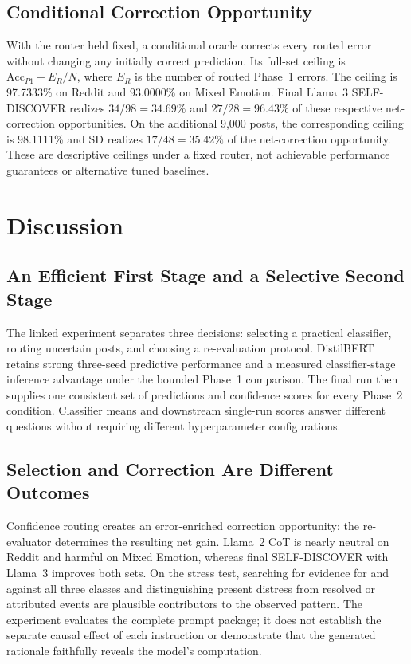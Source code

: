 \documentclass{ieeeaccess}
\begin{document}
\subsection{Conditional Correction Opportunity}
With the router held fixed, a conditional oracle corrects every routed error without changing any initially correct prediction. Its full-set ceiling is $\mathrm{Acc}_{P1}+E_R/N$, where $E_R$ is the number of routed Phase~1 errors. The ceiling is 97.7333\% on Reddit and 93.0000\% on Mixed Emotion. Final Llama~3 SELF-DISCOVER realizes $34/98=34.69\%$ and $27/28=96.43\%$ of these respective net-correction opportunities. On the additional 9,000 posts, the corresponding ceiling is 98.1111\% and SD realizes $17/48=35.42\%$ of the net-correction opportunity. These are descriptive ceilings under a fixed router, not achievable performance guarantees or alternative tuned baselines.
\section{Discussion}
\subsection{An Efficient First Stage and a Selective Second Stage}
The linked experiment separates three decisions: selecting a practical classifier, routing uncertain posts, and choosing a re-evaluation protocol. DistilBERT retains strong three-seed predictive performance and a measured classifier-stage inference advantage under the bounded Phase~1 comparison. The final run then supplies one consistent set of predictions and confidence scores for every Phase~2 condition. Classifier means and downstream single-run scores answer different questions without requiring different hyperparameter configurations.

\subsection{Selection and Correction Are Different Outcomes}
Confidence routing creates an error-enriched correction opportunity; the re-evaluator determines the resulting net gain. Llama~2 CoT is nearly neutral on Reddit and harmful on Mixed Emotion, whereas final SELF-DISCOVER with Llama~3 improves both sets. On the stress test, searching for evidence for and against all three classes and distinguishing present distress from resolved or attributed events are plausible contributors to the observed pattern. The experiment evaluates the complete prompt package; it does not establish the separate causal effect of each instruction or demonstrate that the generated rationale faithfully reveals the model's computation.
\end{document}
